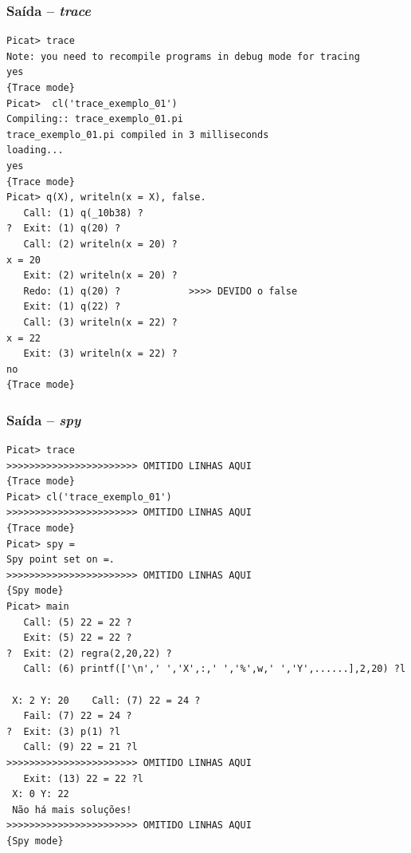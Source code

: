 
\begin{frame}[fragile]

\frametitle{Saída -- \textit{trace}}

\begin{scriptsize}
\begin{verbatim}
Picat> trace
Note: you need to recompile programs in debug mode for tracing
yes
{Trace mode}
Picat>  cl('trace_exemplo_01')
Compiling:: trace_exemplo_01.pi
trace_exemplo_01.pi compiled in 3 milliseconds
loading...
yes
{Trace mode}
Picat> q(X), writeln(x = X), false.
   Call: (1) q(_10b38) ?
?  Exit: (1) q(20) ?
   Call: (2) writeln(x = 20) ?
x = 20
   Exit: (2) writeln(x = 20) ?
   Redo: (1) q(20) ?            >>>> DEVIDO o false
   Exit: (1) q(22) ?
   Call: (3) writeln(x = 22) ?
x = 22
   Exit: (3) writeln(x = 22) ?
no
{Trace mode}
\end{verbatim}
\end{scriptsize}
\end{frame}


\begin{frame}[fragile]

\frametitle{Saída -- \textit{spy}}

\begin{tiny}
\begin{verbatim}
Picat> trace
>>>>>>>>>>>>>>>>>>>>>>> OMITIDO LINHAS AQUI
{Trace mode}
Picat> cl('trace_exemplo_01')
>>>>>>>>>>>>>>>>>>>>>>> OMITIDO LINHAS AQUI
{Trace mode}
Picat> spy =    
Spy point set on =.
>>>>>>>>>>>>>>>>>>>>>>> OMITIDO LINHAS AQUI
{Spy mode}
Picat> main
   Call: (5) 22 = 22 ?
   Exit: (5) 22 = 22 ?
?  Exit: (2) regra(2,20,22) ?
   Call: (6) printf(['\n',' ','X',:,' ','%',w,' ','Y',......],2,20) ?l

 X: 2 Y: 20    Call: (7) 22 = 24 ?
   Fail: (7) 22 = 24 ?
?  Exit: (3) p(1) ?l
   Call: (9) 22 = 21 ?l
>>>>>>>>>>>>>>>>>>>>>>> OMITIDO LINHAS AQUI  
   Exit: (13) 22 = 22 ?l
 X: 0 Y: 22 
 Não há mais soluções! 
>>>>>>>>>>>>>>>>>>>>>>> OMITIDO LINHAS AQUI
{Spy mode}
\end{verbatim}
\end{tiny}
\end{frame}




